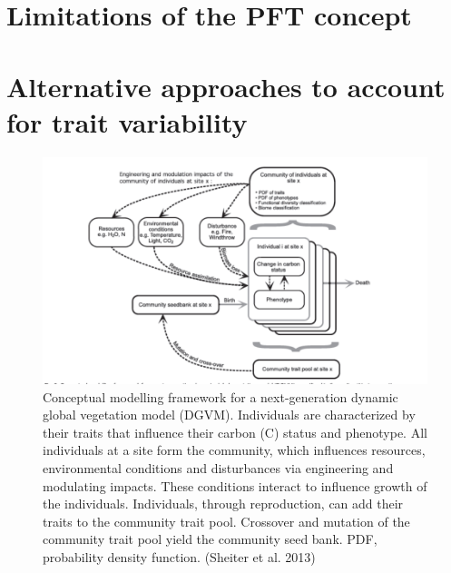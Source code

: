 \documentclass[
  12pt,
  oneside]{book}
\begin{document}
\hypertarget{limitations-of-the-pft-concept}{%
\section{Limitations of the PFT concept}\label{limitations-of-the-pft-concept}}

\hypertarget{alternative-approaches-to-account-for-trait-variability}{%
\section{Alternative approaches to account for trait variability}\label{alternative-approaches-to-account-for-trait-variability}}

\begin{figure}

{\centering \includegraphics[width=0.8\linewidth]{figures/chap7/f717_aDGVM} 

}

\caption{Conceptual modelling framework for a next-generation dynamic global vegetation model (DGVM). Individuals are characterized by their traits that influence their carbon (C) status and phenotype. All individuals at a site form the community, which influences resources, environmental conditions and disturbances via engineering and modulating impacts. These conditions interact to influence growth of the individuals. Individuals, through reproduction, can add their traits to the community trait pool. Crossover and mutation of the community trait pool yield the community seed bank. PDF, probability density function. (Sheiter et al. 2013)}\label{fig:f717}
\end{figure}
\end{document}
